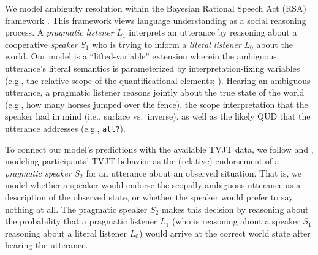 \documentclass[10pt,a4paper]{article}
\newcommand{\gcs}[1]{\textcolor{blue}{[gcs: #1]}}
\newcommand{\lsp}[1]{\textcolor{violet}{[lsp: #1]}}
\begin{document}
We model  ambiguity resolution within the Bayesian Rational Speech Act (RSA) framework \cite{goodmanfrank2016}. This framework views language understanding as a social reasoning process. A \textit{pragmatic listener} $L_1$ interprets an utterance by reasoning about a cooperative \textit{speaker} $S_1$ who is trying to inform a \textit{literal listener} $L_0$ about the world.
Our model is a ``lifted-variable'' extension wherein the ambiguous utterance's literal semantics is parameterized by interpretation-fixing variables (e.g., the relative scope of the quantificational elements; ). Hearing an ambiguous utterance, a pragmatic listener reasons jointly about the true state of the world (e.g., how many horses jumped over the fence), the scope interpretation that the speaker had in mind (i.e., surface vs.~inverse), as well as the likely QUD that the utterance addresses (e.g., \texttt{all?}).  %

To connect our model's predictions with the available TVJT data, we follow  and , modeling participants' TVJT behavior as the (relative) endorsement of  a \textit{pragmatic speaker} $S_2$ for an utterance about an observed situation. That is, we model whether a speaker would endorse the scopally-ambiguous utterance as a description of the observed state, or whether the speaker would prefer to say nothing at all.  
The pragmatic speaker $S_2$ makes this decision by reasoning about the probability that a pragmatic listener $L_1$ (who is reasoning about a speaker $S_1$ reasoning about a literal listener $L_0$) would arrive at the correct world state after hearing the utterance. 
\end{document}

